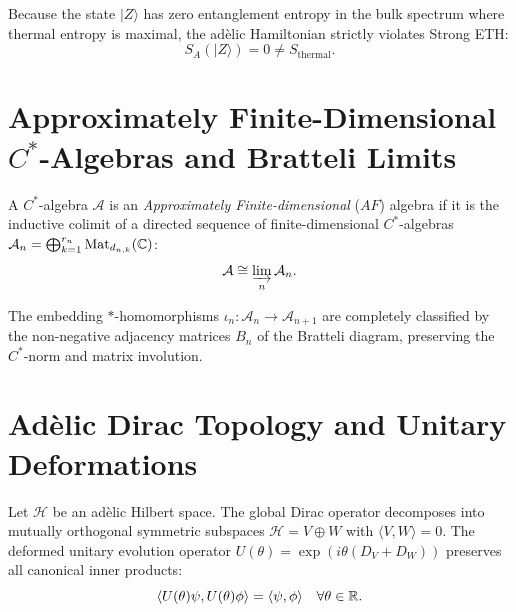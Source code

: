 \begin{theorem}
\label{thm:strong_eth_violation}
\leanok
Because the state $|Z\rangle$ has zero entanglement entropy in the bulk spectrum where thermal entropy is maximal, the adèlic Hamiltonian strictly violates Strong ETH:
\[
S_A(|Z\rangle) = 0 \neq S_{\mathrm{thermal}}.
\]
\end{theorem}

\section{Approximately Finite-Dimensional $C^*$-Algebras and Bratteli Limits}

\begin{definition}
\label{def:af_algebra_category}
\leanok
A $C^*$-algebra $\mathcal{A}$ is an \emph{Approximately Finite-dimensional} ($AF$) algebra if it is the inductive colimit of a directed sequence of finite-dimensional $C^*$-algebras $\mathcal{A}_n = \bigoplus_{k=1}^{r_n} \mathrm{Mat}_{d_{n, k}}(\mathbb{C})$:
\[
\mathcal{A} \cong \varinjlim_{n} \mathcal{A}_n.
\]
\end{definition}

\begin{definition}
\label{def:bratteli_diagram}
\leanok
The embedding $*$-homomorphisms $\iota_n : \mathcal{A}_n \to \mathcal{A}_{n+1}$ are completely classified by the non-negative adjacency matrices $B_n$ of the Bratteli diagram, preserving the $C^*$-norm and matrix involution.
\end{definition}

\section{Adèlic Dirac Topology and Unitary Deformations}

\begin{definition}
\label{def:adelic_dirac_topology}
\leanok
Let $\mathcal{H}$ be an adèlic Hilbert space. The global Dirac operator decomposes into mutually orthogonal symmetric subspaces $\mathcal{H} = V \oplus W$ with $\langle V, W \rangle = 0$. The deformed unitary evolution operator $U(\theta) = \exp(i \theta (D_V + D_W))$ preserves all canonical inner products:
\[
\langle U(\theta) \psi, U(\theta) \phi \rangle = \langle \psi, \phi \rangle \quad \forall \theta \in \mathbb{R}.
\]
\end{definition}
